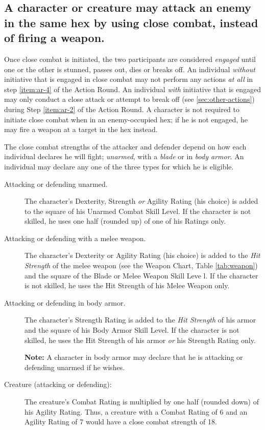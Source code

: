 \subsection[Close Combat]{A character or creature may attack an enemy
  in the same hex by using close combat, instead of firing a weapon.} 
\label{sec:close-combat}



Once close combat is initiated, the two participants are considered
\emph{engaged} until one or the other is stunned, passes out, dies or
breaks off. An individual \emph{without} initiative that is engaged in
close combat may not perform any actions \emph{at all} in step
\ref{item:ar-4} of the Action Round. An individual \emph{with}
initiative that is engaged may only conduct a close attack or attempt
to break off (see \ref{sec:other-actions}) during Step \ref{item:ar-2}
of the Action Round. A character is not required to initiate close
combat when in an enemy-occupied hex; if he is not engaged, he may
fire a weapon at a target in the hex instead.

The close combat strengths of the attacker and defender depend on how
each individual declares he will fight; \emph{unarmed}, with a
\emph{blade} or in \emph{body armor}. An individual may declare any
one of the three types for which he is eligible.

\begin{description}
\item[Attacking or defending unarmed.] The character's Dexterity,
  Strength \emph{or} Agility Rating (his choice) is added to the
  square of his Unarmed Combat Skill Level. If the character is not
  skilled, he uses one half (rounded up) of one of his Ratings only.
\item[Attacking or defending with a melee weapon.] The character's
  Dexterity or Agility Rating (his choice) is added to the \emph{Hit
    Strength} of the melee weapon (see the Weapon Chart, Table
  \vref{tab:weapon}) and the square of the Blade or Melee Weapon Skill
  Leve l. If the character is not skilled, he uses the Hit Strength of
  his Melee Weapon only.
\item[Attacking or defending in body armor.] The character's Strength
  Rating is added to the \emph{Hit Strength} of his armor and the
  square of his Body Armor Skill Level. If the character is not
  skilled, he uses the Hit Strength of his armor \emph{or} his
  Strength Rating only.

  \textbf{Note:} A character in body armor may declare that he is
  attacking or defending unarmed if he wishes. 
\item[Creature (attacking or defending):] The creature's Combat Rating
  is multiplied by one half (rounded down) of his Agility Rating.
  Thus, a creature with a Combat Rating of 6 and an Agility Rating of
  7 would have a close combat strength of 18.
\end{description}

